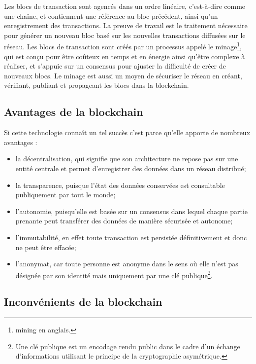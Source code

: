 \documentclass{tnreport}
\begin{document}
Les blocs de transaction sont agencés dans un ordre linéaire, c'est-à-dire comme une chaîne, et contiennent une référence au bloc précédent, ainsi qu'un enregistrement des transactions.
La preuve de travail est le traitement nécessaire pour générer un nouveau bloc basé sur les nouvelles transactions diffusées sur le réseau.
Les blocs de transaction sont créés par un processus appelé le minage\footnote{mining en anglais.}, qui est conçu pour être coûteux en temps et en énergie ainsi qu'être complexe à réaliser, et s'appuie sur un consensus pour ajuster la difficulté de créer de nouveaux blocs. Le minage est aussi un moyen de sécuriser le réseau en créant, vérifiant, publiant et propageant les blocs dans la blockchain.

\subsection{Avantages de la blockchain}

Si cette technologie connaît un tel succès c'est parce qu'elle apporte de nombreux avantages : 
\begin{itemize}
	\item la décentralisation, qui signifie que son architecture ne repose pas sur une entité centrale et permet d'enregistrer des données dans un réseau distribué; 
	\item la transparence, puisque l'état des données conservées est consultable publiquement par tout le monde; 
	\item l'autonomie, puisqu'elle est basée sur un consensus dans lequel chaque partie prenante peut transférer des données de manière sécurisée et autonome;
	\item l'immutabilité, en effet toute transaction est persistée définitivement et donc ne peut être effacée;
	\item l'anonymat, car toute personne est anonyme dans le sens où elle n'est pas désignée par son identité mais uniquement par une clé publique\footnote{Une clé publique est un encodage rendu public dans le cadre d'un échange d'informations utilisant le principe de la cryptographie asymétrique.}.
\end{itemize}

\subsection{Inconvénients de la blockchain}
\end{document}

